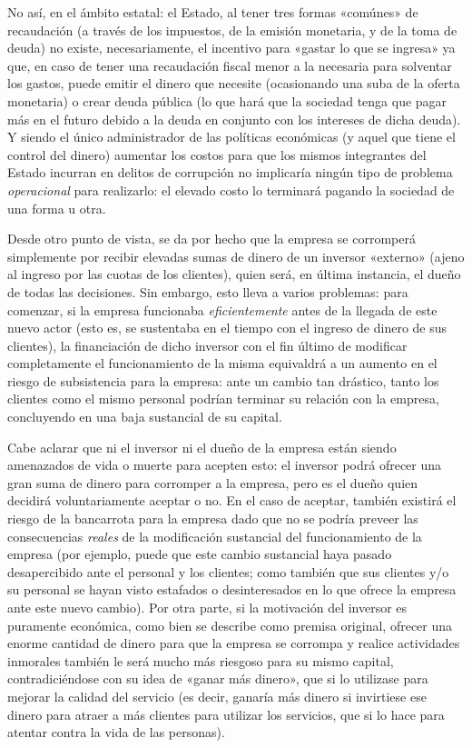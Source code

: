 \documentclass[12pt,a4paper,twoside]{book}
\begin{document}
No así, en el ámbito estatal: el Estado, al tener tres formas «comúnes» de recaudación (a través de los impuestos, de la emisión monetaria, y de la toma de deuda) no existe, necesariamente, el incentivo para «gastar lo que se ingresa» ya que, en caso de tener una recaudación fiscal menor a la necesaria para solventar los gastos, puede emitir el dinero que necesite (ocasionando una suba de la oferta monetaria) o crear deuda pública (lo que hará que la sociedad tenga que pagar más en el futuro debido a la deuda en conjunto con los intereses de dicha deuda). Y siendo el único administrador de las políticas económicas (y aquel que tiene el control del dinero) aumentar los costos para que los mismos integrantes del Estado incurran en delitos de corrupción no implicaría ningún tipo de problema \textit{operacional} para realizarlo: el elevado costo lo terminará pagando la sociedad de una forma u otra.

Desde otro punto de vista, se da por hecho que la empresa se corromperá simplemente por recibir elevadas sumas de dinero de un inversor «externo» (ajeno al ingreso por las cuotas de los clientes), quien será, en última instancia, el dueño de todas las decisiones. Sin embargo, esto lleva a varios problemas: para comenzar, si la empresa funcionaba \textit{eficientemente} antes de la llegada de este nuevo actor (esto es, se sustentaba en el tiempo con el ingreso de dinero de sus clientes), la financiación de dicho inversor con el fin último de modificar completamente el funcionamiento de la misma equivaldrá a un aumento en el riesgo de subsistencia para la empresa: ante un cambio tan drástico, tanto los clientes como el mismo personal podrían terminar su relación con la empresa, concluyendo en una baja sustancial de su capital.

Cabe aclarar que ni el inversor ni el dueño de la empresa están siendo amenazados de vida o muerte para acepten esto: el inversor podrá ofrecer una gran suma de dinero para corromper a la empresa, pero es el dueño quien decidirá voluntariamente aceptar o no. En el caso de aceptar, también existirá el riesgo de la bancarrota para la empresa dado que no se podría preveer las consecuencias \textit{reales} de la modificación sustancial del funcionamiento de la empresa (por ejemplo, puede que este cambio sustancial haya pasado desapercibido ante el personal y los clientes; como también que sus clientes y/o su personal se hayan visto estafados o desinteresados en lo que ofrece la empresa ante este nuevo cambio). Por otra parte, si la motivación del inversor es puramente económica, como bien se describe como premisa original, ofrecer una enorme cantidad de dinero para que la empresa se corrompa y realice actividades inmorales también le será mucho más riesgoso para su mismo capital, contradiciéndose con su idea de «ganar más dinero», que si lo utilizase para mejorar la calidad del servicio (es decir, ganaría más dinero si invirtiese ese dinero para atraer a más clientes para utilizar los servicios, que si lo hace para atentar contra la vida de las personas).
\end{document}
